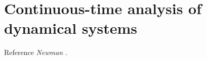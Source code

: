 \chapter{Continuous-time analysis of dynamical systems}
\label{chap:cont}
Reference \textsl{Newman} \cite{newman2018networks}.
